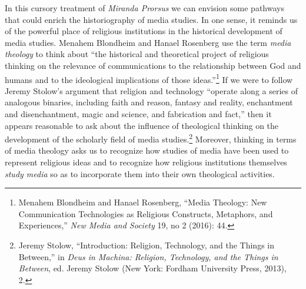 \documentclass{tufte-handout}
\begin{document}
In this cursory treatment of \emph{Miranda Prorsus} we can envision some
pathways that could enrich the historiography of media studies. In one
sense, it reminds us of the powerful place of religious institutions in
the historical development of media studies. Menahem Blondheim and
Hanael Rosenberg use the term \emph{media theology} to think about ``the
historical and theoretical project of religious thinking on the
relevance of communications to the relationship between God and humans
and to the ideological implications of those ideas.''\footnote{Menahem
  Blondheim and Hanael Rosenberg, ``Media Theology: New Communication
  Technologies as Religious Constructs, Metaphors, and Experiences,''
  \emph{New Media and Society} 19, no 2 (2016): 44.} If we were to
follow Jeremy Stolow's argument that religion and technology ``operate
along a series of analogous binaries, including faith and reason,
fantasy and reality, enchantment and disenchantment, magic and science,
and fabrication and fact,'' then it appears reasonable to ask about the
influence of theological thinking on the development of the scholarly
field of media studies.\footnote{Jeremy Stolow, ``Introduction:
  Religion, Technology, and the Things in Between,'' in \emph{Deus in
  Machina: Religion, Technology, and the Things in Between}, ed. Jeremy
  Stolow (New York: Fordham University Press, 2013), 2.} Moreover,
thinking in terms of media theology asks us to recognize how studies of
media have been used to represent religious ideas and to recognize how
religious institutions themselves \emph{study media} so as to
incorporate them into their own theological activities.
\end{document}
